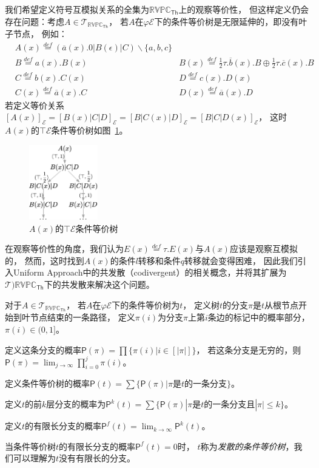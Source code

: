 我们希望定义符号互模拟关系的全集为$\mathbb{RVPC}_{\mathsf{Th}}$上的观察等价性，
但这样定义仍会存在问题：考虑$A\in\mathcal{T}_{\mathbb{RVPC}_{\mathsf{Th}}}$，
若$A$在$\varphi\mathcal{E}$下的条件等价树是无限延伸的，即没有叶子节点，
例如：
\begin{align*}
   &A(x) \stackrel{def}{=} (\overline{a}(x).0|B(\epsilon)|C)\backslash \{a,b,c\} &\\
   &B\stackrel{def}{=}a(x).B(x)
   &B(x)\stackrel{def}{=} \frac{1}{2}\tau.\overline{b}(x).B\oplus \frac{1}{2}\tau.\overline{c}(x).B\\
   &C\stackrel{def}{=} b(x).C(x)
   &D\stackrel{def}{=} c(x).D(x)\\
   &C(x)\stackrel{def}{=} \overline{a}(x).C
   &D(x)\stackrel{def}{=} \overline{a}(x).D
\end{align*}
若定义等价关系$[A(x)]_{\mathcal{E}}=[B(x)|C|D]_{\mathcal{E}}=[B|C(x)|D]_{\mathcal{E}}=[B|C|D(x)]_{\mathcal{E}}$，
这时$A(x)$的$\top \mathcal{E}$条件等价树如图~\ref{fig:divergent}。
\begin{figure}[!htbp]
   \small
   \centering
   \includegraphics[width=3cm]{../figures/codivergent.png}
   \caption[]{$A(x)$的$\top \mathcal{E}$条件等价树} 
   \label{fig:divergent}
\end{figure}
在观察等价性的角度，我们认为$E(x)\stackrel{def}{=}\tau.E(x)$与$A(x)$应该是观察互模拟的，
然而，这时找到$A(x)$的条件$l$转移和条件$q$转移就会变得困难，
因此我们引入Uniform Approach中的共发散（codivergent）\cite{Fu_UniformApproach}的相关概念，并将其扩展为$\mathcal{T}){\mathbb{RVPC}_{\mathsf{Th}}}$下的共发散来解决这个问题。

\begin{definition}[发散]\label{def:divergent}
   对于$A\in\mathcal{T}_{\mathbb{RVPC}_{\mathsf{Th}}}$，
   若$A$在$\varphi\mathcal{E}$下的条件等价树为$t$，
   定义树$t$的分支$\pi$是$t$从根节点开始到叶节点结束的一条路径，
   定义$\pi(i)$为分支$\pi$上第$i$条边的标记中的概率部分，$\pi(i)\in(0,1]$。

   定义这条分支的概率$\mathsf{P}(\pi)=\prod\{\pi(i)|i\in [|\pi|]\}$，
   若这条分支是无穷的，则$\mathsf{P}(\pi)=\lim_{j\rightarrow \infty}\prod_{i=0}^{j}\pi(i)$。

   定义条件等价树的概率$\mathsf{P}(t)=\sum\{\mathsf{P}(\pi)|\pi\textrm{是}t\textrm{的一条分支}\}$。
   
   定义$t$的前$k$层分支的概率为$\mathsf{P}^k(t)=\sum \{\mathsf{P}(\pi)|\pi\textrm{是}t\textrm{的一条分支且}|\pi|\leq k\}$。

   定义$t$的有限长分支的概率$\mathsf{P}^f(t)=\lim_{k\rightarrow\infty}\mathsf{P}^k(t)$。

   当条件等价树$t$的有限长分支的概率$\mathsf{P}^f(t)=0$时，
   $t$称为\textit{发散的条件等价树}，我们可以理解为$t$没有有限长的分支。
\end{definition}

